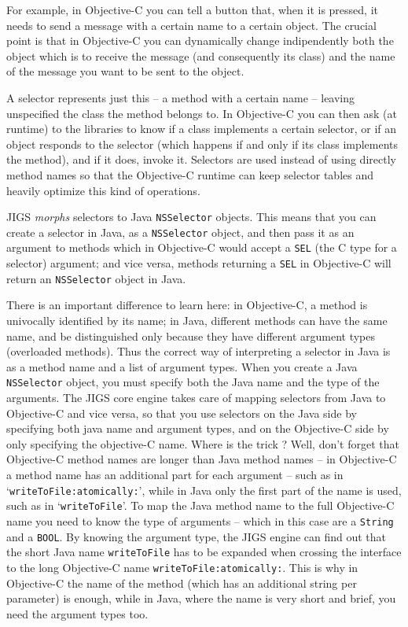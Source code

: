 For example, in Objective-C you can tell a button that, when it is
pressed, it needs to send a message with a certain name to a certain
object.  The crucial point is that in Objective-C you can dynamically
change indipendently both the object which is to receive the message
(and consequently its class) and the name of the message you want to
be sent to the object.  

A selector represents just this -- a method with a certain name --
leaving unspecified the class the method belongs to.  In Objective-C
you can then ask (at runtime) to the libraries to know if a class
implements a certain selector, or if an object responds to the
selector (which happens if and only if its class implements the
method), and if it does, invoke it.  Selectors are used instead of
using directly method names so that the Objective-C runtime can keep
selector tables and heavily optimize this kind of operations.

JIGS {\sl morphs} selectors to Java \texttt{NSSelector} objects.  This
means that you can create a selector in Java, as a \texttt{NSSelector}
object, and then pass it as an argument to methods which in
Objective-C would accept a \texttt{SEL} (the C type for a selector)
argument; and vice versa, methods returning a \texttt{SEL} in
Objective-C will return an \texttt{NSSelector} object in Java.

There is an important difference to learn here: in Objective-C, a
method is univocally identified by its name; in Java, different
methods can have the same name, and be distinguished only because they
have different argument types (overloaded methods).  Thus the correct
way of interpreting a selector in Java is as a method name and a list
of argument types.  When you create a Java \texttt{NSSelector} object,
you must specify both the Java name and the type of the arguments.
The JIGS core engine takes care of mapping selectors from Java to
Objective-C and vice versa, so that you use selectors on the Java side
by specifying both java name and argument types, and on the
Objective-C side by only specifying the objective-C name.  Where is
the trick ?  Well, don't forget that Objective-C method names are
longer than Java method names -- in Objective-C a method name has an
additional part for each argument -- such as in
`\texttt{writeToFile:atomically:}', while in Java only the first part
of the name is used, such as in `\texttt{writeToFile}'.  To map the
Java method name to the full Objective-C name you need to know the
type of arguments -- which in this case are a \texttt{String} and a
\texttt{BOOL}.  By knowing the argument type, the JIGS engine can find
out that the short Java name \texttt{writeToFile} has to be expanded
when crossing the interface to the long Objective-C name
\texttt{writeToFile:atomically:}.  This is why in Objective-C the name 
of the method (which has an additional string per parameter) is
enough, while in Java, where the name is very short and brief, you
need the argument types too.

